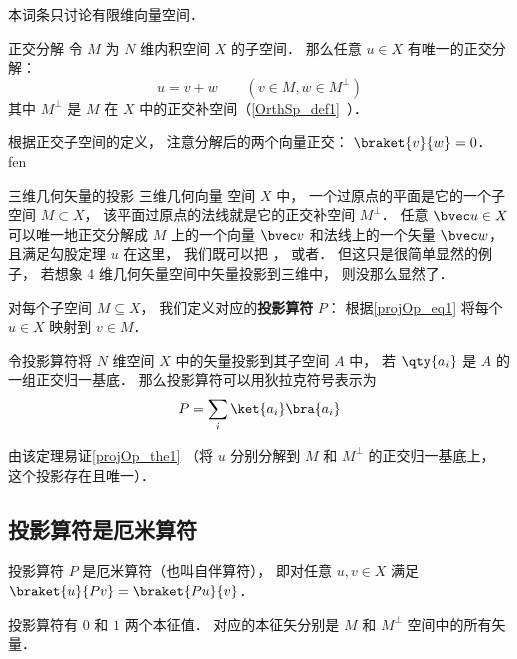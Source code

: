 

本词条只讨论有限维向量空间．

\begin{theorem}{正交分解}\label{projOp_the1}
令 $M$ 为 $N$ 维内积空间 $X$ 的子空间． 那么任意 $u\in X$ 有唯一的正交分解：
\begin{equation}\label{projOp_eq1}
u = v + w \qquad (v\in M, w\in M^\bot)
\end{equation}
其中 $M^\bot$ 是 $M$ 在 $X$ 中的正交补空间（\autoref{OrthSp_def1}~）．
\end{theorem}
根据正交子空间的定义， 注意分解后的两个向量正交： $\braket{v}{w} = 0$． fen

\begin{example}{三维几何矢量的投影}
三维几何向量 空间 $X$ 中， 一个过原点的平面是它的一个子空间 $M \subset X$， 该平面过原点的法线就是它的正交补空间 $M^\bot$．  任意 $\bvec u \in X$ 可以唯一地正交分解成 $M$ 上的一个向量 $\bvec v$ 和法线上的一个矢量 $\bvec w$， 且满足勾股定理 $u$
在这里， 我们既可以把   ， 或者． 但这只是很简单显然的例子， 若想象 4 维几何矢量空间中矢量投影到三维中， 则没那么显然了．
\end{example}

对每个子空间 $M\subseteq X$， 我们定义对应的\textbf{投影算符} $P$： 根据\autoref{projOp_eq1} 将每个 $u\in X$ 映射到 $v\in M$．

\begin{theorem}{}
令投影算符将 $N$ 维空间 $X$ 中的矢量投影到其子空间 $A$ 中， 若 $\qty{a_i}$ 是 $A$ 的一组正交归一基底． 那么投影算符可以用狄拉克符号表示为
\begin{equation}
P = \sum_i \ket{a_i}\bra{a_i}
\end{equation}
\end{theorem}
由该定理易证\autoref{projOp_the1} （将 $u$ 分别分解到 $M$ 和 $M^\bot$ 的正交归一基底上， 这个投影存在且唯一）．



\subsection{投影算符是厄米算符}
投影算符 $P$ 是厄米算符（也叫自伴算符）， 即对任意 $u, v\in X$ 满足 $\braket{u}{Pv} = \braket{Pu}{v}$．

投影算符有 $0$ 和 $1$ 两个本征值． 对应的本征矢分别是 $M$ 和 $M^\bot$ 空间中的所有矢量．

